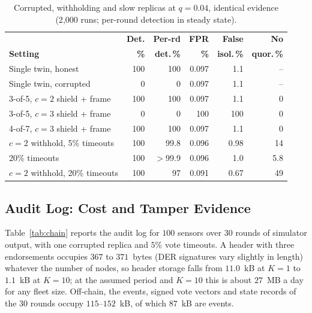 \documentclass{ieeeaccess}
\begin{document}
\begin{table}[!t]
\caption{Corrupted, withholding and slow replicas at $q=0.04$, identical evidence (2{,}000 runs; per-round detection in steady state).}
\label{tab:collusion}
\centering
\renewcommand{\arraystretch}{1.08}
\footnotesize
\setlength{\tabcolsep}{2.0pt}
\begin{tabular}{p{}rrrrr}
\toprule
 & \textbf{Det.} & \textbf{Per-rd} & \textbf{FPR} & \textbf{False} & \textbf{No} \\
\textbf{Setting} & \textbf{\%} & \textbf{det.\,\%} & \textbf{\%} & \textbf{isol.\,\%} & \textbf{quor.\,\%} \\
\midrule
Single twin, honest & 100 & 100 & 0.097 & 1.1 & -- \\
Single twin, corrupted & 0 & 0 & 0.097 & 1.1 & -- \\
3-of-5, $c=2$ shield + frame & 100 & 100 & 0.097 & 1.1 & 0 \\
3-of-5, $c=3$ shield + frame & 0 & 0 & 100 & 100 & 0 \\
4-of-7, $c=3$ shield + frame & 100 & 100 & 0.097 & 1.1 & 0 \\
\midrule
$c=2$ withhold, 5\% timeouts & 100 & 99.8 & 0.096 & 0.98 & 14 \\
20\% timeouts & 100 & $>$99.9 & 0.096 & 1.0 & 5.8 \\
$c=2$ withhold, 20\% timeouts & 100 & 97 & 0.091 & 0.67 & 49 \\
\bottomrule
\end{tabular}
\end{table}

\subsection{Audit Log: Cost and Tamper Evidence}
\label{sec:res-ext3}
Table~\ref{tab:chain} reports the audit log for $100$ sensors over
$30$ rounds of simulator output, with one corrupted replica and $5\%$
vote timeouts.  A header with three endorsements occupies $367$ to
$371$~bytes (DER signatures vary slightly in length) whatever the
number of nodes, so header storage falls from $11.0$~kB at $K=1$ to
$1.1$~kB at $K=10$; at the assumed period and $K=10$ this is about
$27$~MB a day for any fleet size.  Off-chain, the events, signed vote
vectors and state records of the 30 rounds occupy $115$--$152$~kB, of
which $87$~kB are events.
\end{document}
